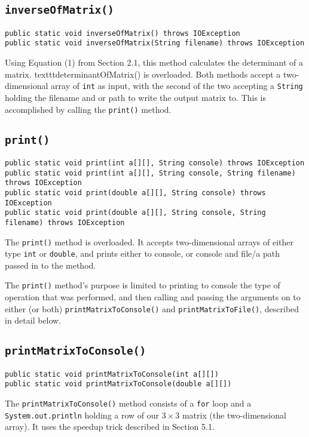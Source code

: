 \documentclass[12pt]{article}
\begin{document}
\subsection{\texttt{inverseOfMatrix()}}
\begin{verbatim}
public static void inverseOfMatrix() throws IOException
public static void inverseOfMatrix(String filename) throws IOException
\end{verbatim}
Using Equation (1) from Section 2.1, this method calculates the determinant of a matrix. texttt{determinantOfMatrix()} is overloaded. Both methods accept a two-dimensional array of \texttt{int} as input, with the second of the two accepting a \texttt{String} holding the filename and or path to write the output matrix to. This is accomplished by calling the \texttt{print()} method.

\subsection{\texttt{print()}}
\begin{verbatim}
public static void print(int a[][], String console) throws IOException
public static void print(int a[][], String console, String filename) throws IOException
public static void print(double a[][], String console) throws IOException
public static void print(double a[][], String console, String filename) throws IOException
\end{verbatim}
The \texttt{print()} method is overloaded. It accepts two-dimensional arrays of either type \texttt{int} or \texttt{double}, and prints either to console, or console and file/a path passed in to the method.
\par The \texttt{print()} method's purpose is limited to printing to console the type of operation that was performed, and then calling and passing the arguments on to either (or both) \texttt{printMatrixToConsole()} and \texttt{printMatrixToFile()}, described in detail below.

\subsection{\texttt{printMatrixToConsole()}}
\begin{verbatim}
public static void printMatrixToConsole(int a[][])
public static void printMatrixToConsole(double a[][])
\end{verbatim}
The \texttt{printMatrixToConsole()} method consists of a \texttt{for} loop and a \texttt{System.out.println} holding a row of our $3\times3$ matrix (the two-dimensional array). It uses the speedup trick described in Section 5.1.
\end{document}
